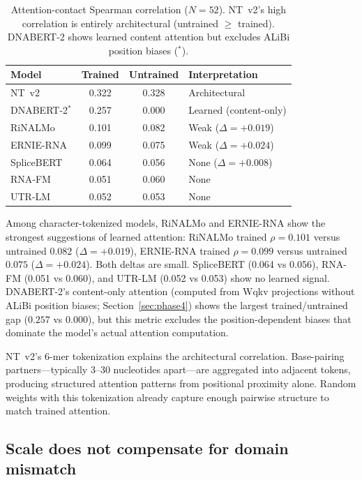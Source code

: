 \documentclass[11pt]{article}
\begin{document}
\begin{table}[t]
\centering
\caption{Attention-contact Spearman correlation ($N = 52$).  NT~v2's
  high correlation is entirely architectural (untrained $\geq$
  trained).  DNABERT-2 shows learned content attention but excludes
  ALiBi position biases ($^*$).}
\label{tab:attention}
\begin{tabular}{@{}lccl@{}}
\toprule
\textbf{Model} & \textbf{Trained} & \textbf{Untrained} &
  \textbf{Interpretation} \\
\midrule
NT~v2      & 0.322 & 0.328 & Architectural \\
DNABERT-2$^*$  & 0.257 & 0.000 & Learned (content-only) \\
RiNALMo    & 0.101 & 0.082 & Weak ($\Delta = +0.019$) \\
ERNIE-RNA  & 0.099 & 0.075 & Weak ($\Delta = +0.024$) \\
SpliceBERT & 0.064 & 0.056 & None ($\Delta = +0.008$) \\
RNA-FM     & 0.051 & 0.060 & None \\
UTR-LM     & 0.052 & 0.053 & None \\
\bottomrule
\end{tabular}
\end{table}

Among character-tokenized models, RiNALMo and ERNIE-RNA show the
strongest suggestions of learned attention: RiNALMo trained $\rho =
0.101$ versus untrained $0.082$ ($\Delta = +0.019$), ERNIE-RNA
trained $\rho = 0.099$ versus untrained $0.075$ ($\Delta = +0.024$).
Both deltas are small.  SpliceBERT (0.064 vs 0.056), RNA-FM (0.051
vs 0.060), and UTR-LM (0.052 vs 0.053) show no learned signal.
DNABERT-2's content-only attention (computed from Wqkv projections
without ALiBi position biases; Section~\ref{sec:phase4}) shows the
largest trained/untrained gap ($0.257$ vs $0.000$), but this metric
excludes the position-dependent biases that dominate the model's
actual attention computation.

NT~v2's 6-mer tokenization explains the architectural correlation.
Base-pairing partners---typically 3--30 nucleotides apart---are
aggregated into adjacent tokens, producing structured attention
patterns from positional proximity alone.  Random weights with this
tokenization already capture enough pairwise structure to match
trained attention.

\subsection{Scale does not compensate for domain mismatch}
\label{sec:scale}
\end{document}

